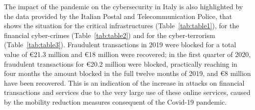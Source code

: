 \documentclass{easychair}
\begin{document}
The impact of the pandemic on the cybersecurity in Italy is also highlighted by the data
provided by the Italian Postal and Telecommunication Police, that shows the situation for the
critical infrastructures (Table~\ref{tab:table1}), for the financial cyber-crimes
(Table~\ref{tab:table2}) and for the cyber-terrorism (Table~\ref{tab:table3}). 
Fraudulent transactions in 2019 were blocked for a total value of \euro 21.3 million and \euro 18 million were recovered; in the first quarter of 
2020, fraudulent transactions for \euro 20.2 million were blocked,
practically reaching in four months the amount
blocked in the full twelve months of 2019, and \euro 8 million have been
recovered. This is an indication of the increase in attacks on financial transactions
and services due to the very large use of these online services, caused by the mobility reduction
measures consequent of the Covid-19 pandemic.

\begin{table}[h]
  \begin{center}
    \end{center}
	
	\caption{Data of critical structure protection collected by Italian Postal and Telecommunication Police~\cite{oad20}.}									
	\label{tab:table1}									
\end{table}	
\end{document}
